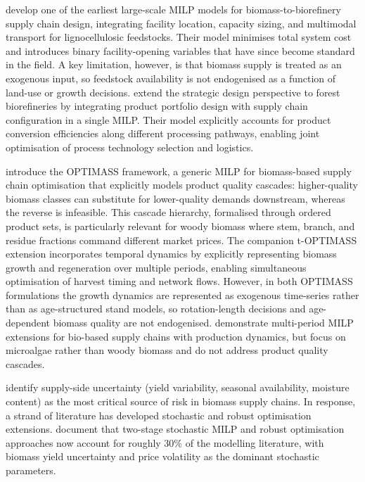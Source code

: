 \documentclass[preprint,review,1p,authoryear]{elsarticle} %
\begin{document}
\citet{Eksioglu2009_Biorefinery_SC} develop one of the earliest large-scale
MILP models for biomass-to-biorefinery supply chain design, integrating
facility location, capacity sizing, and multimodal transport for
lignocellulosic feedstocks. Their model minimises total system cost and
introduces binary facility-opening variables that have since become
standard in the field. A key limitation, however, is that biomass supply
is treated as an exogenous input, so feedstock availability is not
endogenised as a function of land-use or growth decisions.
\citet{Mansoornejad2013_Forest_Biorefinery_SC} extend the strategic design
perspective to forest biorefineries by integrating product portfolio
design with supply chain configuration in a single MILP. Their model
explicitly accounts for product conversion efficiencies along different
processing pathways, enabling joint optimisation of process technology
selection and logistics.

\citet{DeMeyer2015_OPTIMASS} introduce the OPTIMASS framework, a generic MILP
for biomass-based supply chain optimisation that explicitly models
product quality cascades: higher-quality biomass classes can substitute
for lower-quality demands downstream, whereas the reverse is infeasible.
This cascade hierarchy, formalised through ordered product sets, is
particularly relevant for woody biomass where stem, branch, and residue
fractions command different market prices. The companion t-OPTIMASS
extension \citep{DeMeyer2016_tOPTIMASS} incorporates temporal dynamics by
explicitly representing biomass growth and regeneration over multiple
periods, enabling simultaneous optimisation of harvest timing and
network flows. However, in both OPTIMASS formulations the growth
dynamics are represented as exogenous time-series rather than as
age-structured stand models, so rotation-length decisions and
age-dependent biomass quality are not endogenised.
\citet{Arabi2019_Microalgae_Biobutanol_SC} demonstrate multi-period MILP
extensions for bio-based supply chains with production dynamics, but
focus on microalgae rather than woody biomass and do not address product
quality cascades.

\citet{Sharma2013_BSC_review} identify supply-side uncertainty (yield
variability, seasonal availability, moisture content) as the most
critical source of risk in biomass supply chains. In response, a strand
of literature has developed stochastic and robust optimisation
extensions. \citet{Zahraee2020_BSC_review} document that two-stage stochastic
MILP and robust optimisation approaches now account for roughly 30\% of
the modelling literature, with biomass yield uncertainty and price
volatility as the dominant stochastic parameters.
\end{document}
